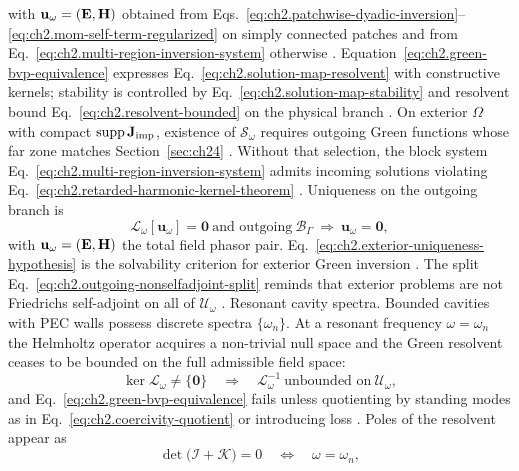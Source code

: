 with \(\mathbf{u}_\omega=(\mathbf{E},\mathbf{H})\) obtained from
Eqs.~\eqref{eq:ch2.patchwise-dyadic-inversion}--\eqref{eq:ch2.mom-self-term-regularized}
on simply connected patches and from
Eq.~\eqref{eq:ch2.multi-region-inversion-system} otherwise
\cite{harrington2001}. Equation~\eqref{eq:ch2.green-bvp-equivalence}
expresses Eq.~\eqref{eq:ch2.solution-map-resolvent} with constructive kernels; stability
is controlled by Eq.~\eqref{eq:ch2.solution-map-stability} and resolvent bound
Eq.~\eqref{eq:ch2.resolvent-bounded} on the physical branch
\cite{stratton1941}.
On exterior \(\Omega\) with compact \(\operatorname{supp}\mathbf{J}_{\mathrm{imp}}\), existence of
\(\mathcal{S}_\omega\) requires outgoing Green functions whose far zone matches
Section~\ref{sec:ch24} \cite{stratton1941}. Without that selection, the block system
Eq.~\eqref{eq:ch2.multi-region-inversion-system} admits incoming solutions violating
Eq.~\eqref{eq:ch2.retarded-harmonic-kernel-theorem} \cite{harrington2001}. Uniqueness
on the outgoing branch is
\begin{equation}
\label{eq:ch2.exterior-uniqueness-hypothesis}
\mathcal{L}_\omega[\mathbf{u}_\omega]=\mathbf{0}
\ \text{and outgoing}\ \mathcal{B}_\Gamma
\ \Longrightarrow\
\mathbf{u}_\omega=\mathbf{0},
\end{equation}
with \(\mathbf{u}_\omega=(\mathbf{E},\mathbf{H})\) the total field phasor pair. Eq.~\eqref{eq:ch2.exterior-uniqueness-hypothesis} is the solvability criterion for
exterior Green inversion \cite{stratton1941}. The split
Eq.~\eqref{eq:ch2.outgoing-nonselfadjoint-split} reminds that exterior problems are
not Friedrichs self-adjoint on all of \(\mathcal{U}_\omega\)
\cite{harrington2001}.
Resonant cavity spectra. Bounded cavities with PEC walls possess discrete spectra \(\{\omega_n\}\).
At a resonant frequency \(\omega=\omega_n\) the Helmholtz operator acquires a
non-trivial null space and the Green resolvent ceases to be bounded on the full
admissible field space:
\begin{equation}
\label{eq:ch2.cavity-resonance-failure}
\ker\mathcal{L}_\omega\neq\{\mathbf{0}\}
\quad\Longrightarrow\quad
\mathcal{L}_\omega^{-1}\ \text{unbounded on}\ \mathcal{U}_\omega,
\end{equation}
and Eq.~\eqref{eq:ch2.green-bvp-equivalence} fails unless quotienting by standing
modes as in Eq.~\eqref{eq:ch2.coercivity-quotient} or introducing loss
\cite{stratton1941}. Poles of the resolvent appear as
\begin{equation}
\label{eq:ch2.resolvent-pole-cavity}
\det\big(\mathcal{I}+\mathcal{K}\big)=0
\quad\Longleftrightarrow\quad
\omega=\omega_n,
\end{equation}
